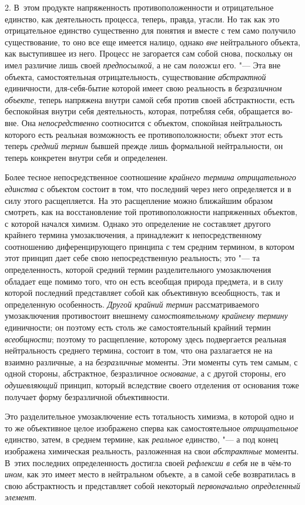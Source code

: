 2. В~этом продукте напряженность противоположенности и
отрицательное единство, как деятельность процесса, теперь, правда, угасли.
Но так как это отрицательное единство существенно для понятия и вместе с
тем само получило существование, то оно все еще имеется налицо, однако
{\em вне} нейтрального
объекта, как выступившее из него. Процесс не загорается сам собой снова,
поскольку он имел различие лишь своей
{\em предпосылкой}, а не
сам {\em положил} его. "---
Эта вне объекта, самостоятельная отрицательность,
существование {\em абстрактной}
единичности, для-себя-бытие которой имеет свою реальность в
{\em безразличном объекте},
теперь напряжена внутри самой себя против своей
абстрактности, есть беспокойная внутри себя деятельность, которая,
потребляя себя, обращается во-вне. Она
{\em непосредственно}
соотносится с объектом, спокойная нейтральность которого есть
реальная возможность ее противоположности; объект этот есть теперь
{\em средний термин}
бывшей прежде лишь формальной нейтральности, он теперь
конкретен внутри себя и определенен.

Более тесное непосредственное соотношение
{\em крайнего термина отрицательного
единства} с объектом состоит в том, что последний через него
определяется и в силу этого расщепляется. На это расщепление можно
ближайшим образом смотреть, как на восстановление той противоположности
напряженных объектов, с которой начался химизм. Однако это определение не
составляет другого крайнего термина умозаключения, а принадлежит к
непосредственному соотношению диференцирующего принципа с тем средним
термином, в котором этот принцип дает себе свою непосредственную
реальность; это "--- та определенность, которой средний термин
разделительного умозаключения обладает еще помимо того, что он есть
всеобщая природа предмета, и в силу которой последний представляет собой
как объективную всеобщность, так и определенную особенность.
{\em Другой крайний термин}
рассматриваемого умозаключения противостоит внешнему
{\em самостоятельному крайнему термину}
единичности; он поэтому есть столь же самостоятельный крайний
термин {\em всеобщности};
поэтому то расщепление, которому здесь подвергается реальная
нейтральность среднего термина, состоит в том, что она разлагается не на
взаимно различные, а на
{\em безразличные}
моменты. Эти моменты суть тем самым, с одной стороны,
абстрактное, безразличное
{\em основание}, а с
другой стороны, его {\em одушевляющий}
принцип, который вследствие своего отделения
от основания тоже получает форму безразличной объективности.

Это разделительное умозаключение есть тотальность химизма, в
которой одно и то же объективное целое изображено сперва как
самостоятельное {\em отрицательное}
единство, затем, в среднем термине, как
{\em реальное} единство,
"--- а под конец изображена химическая реальность, разложенная
на свои {\em абстрактные}
моменты. В~этих последних определенность достигла своей
{\em рефлексии в себя} не
в чём-то {\em ином},
как это имеет место в нейтральном объекте, а в самой себе
возвратилась в свою абстрактность и представляет собой некоторый
{\em первоначально определенный
элемент}.

